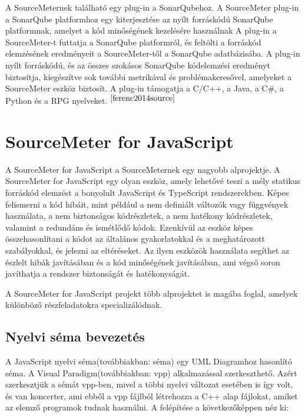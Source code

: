\noindent

A SourceMeternek található egy plug-in a SonarQubehoz.
A SourceMeter plug-in a SonarQube platformhoz egy kiterjesztése az nyílt forráskódú SonarQube platformnak, amelyet a kód minőségének kezelésére használnak
A plug-in a SourceMeter-t futtatja a SonarQube platformról, és feltölti a forráskód elemzésének eredményeit a SourceMeter-től a SonarQube adatbázisába.
A plug-in nyílt forráskódú, és az összes szokásos SonarQube kódelemzési eredményt biztosítja, kiegészítve sok további metrikával és problémakeresővel, amelyeket a SourceMeter eszköz biztosít.
A plug-in támogatja a C/C++, a Java, a C\#, a Python és a RPG nyelveket.$^{~\cite{ferenc2014source}}$

\section{SourceMeter for JavaScript}

\noindent

A SourceMeter for JavaScript a SourceMeternek egy nagyobb alprojektje.
A SourceMeter for JavaScript egy olyan eszköz, amely lehetővé teszi a mély statikus forráskód elemzést a bonyolult JavaScript és TypeScript rendszerekben.
Képes felismerni a kód hibáit, mint például a nem definiált változók vagy függvények használata, a nem biztonságos kódrészletek, a nem hatékony kódrészletek, valamint a redundáns és ismétlődő kódok.
Ezenkívül az eszköz képes összehasonlítani a kódot az általános gyakorlatokkal és a meghatározott szabályokkal, és jelezni az eltéréseket.
Az ilyen eszközök használata segíthet az észlelt hibák javításában és a kód minőségének javításában, ami végső soron javíthatja a rendszer biztonságát és hatékonyságát.

\noindent

A SourceMeter for JavaScript projekt több alprojektet is magába foglal, amelyek különböző részfeladatokra specializálódnak.

\subsection{Nyelvi séma bevezetés}\label{chap:nyelvi_sema}

A JavaScript nyelvi séma(továbbiakban: séma) egy UML Diagramhoz hasonlító séma.
A Visual Paradigm(továbbiakban: vpp) alkalmazással szerkeszthető.
Azért szerkesztjük a sémát vpp-ben, mivel a többi nyelvi változat esetében is így volt, és van koncerter, ami ebből a vpp fájlból létrehozza a C++ alap fájlokat, amiket az elemző programok tudnak használni.
A felépítése a következőképpen néz ki:

